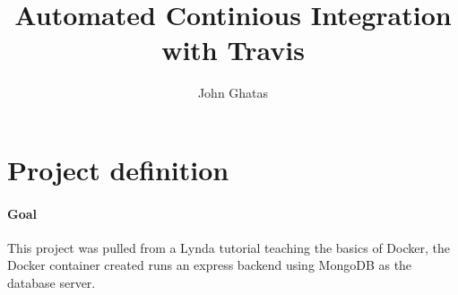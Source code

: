 \documentclass{article}
\title{Automated Continious Integration with Travis}
\date{\displaydate{date}}
\author{John Ghatas}
\begin{document}
    \maketitle
    \newpage
    
    \tableofcontents
    \newpage

    \section{Project definition}
    \paragraph{Goal}{This project was pulled from a Lynda tutorial teaching the basics of Docker, 
    the Docker container created runs an express backend using MongoDB as the database server.}

    \subsection{}
\end{document}
